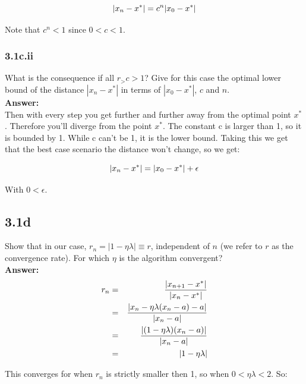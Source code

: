 \documentclass[a4paper]{article}
\begin{document}
\begin{equation}
\abs{x_n-x^*} = c^n \abs{x_0 - x^{*}}
\end{equation}

Note that $c^n < 1$ since $ 0 < c < 1$.


\subsubsection*{3.1c.ii}

What is the consequence if all $r_ > c > 1$? Give for this case the optimal lower bound of the distance $|x_n - x^*|$ in terms of $|x_0 - x^*|$, $c$ and $n$.\\

\textbf{Answer:}\\


Then with every step you get further and further away from the optimal point $x^*$. Therefore you'll diverge from the point $x^*$. The constant c is larger than 1, so it is bounded by 1. While c can't be 1, it is the lower bound. Taking this we get that the best case scenario the distance won't change, so we get:

\begin{equation}
\abs{x_n-x^*} = \abs{x_0-x^*} + \epsilon
\end{equation}

With $0 < \epsilon$.

\subsection*{3.1d}

Show that in our case, $r_n = |1 - \eta \lambda| \equiv r$, independent of $n$ (we refer to $r$ as the convergence rate). For which $\eta$ is the algorithm convergent?\\

\textbf{Answer:}\\

\begin{eqnarray}
r_n &=& \frac{\abs{x_{n+1} - x^*}}{\abs{x_n - x^*}}\\
&=& \frac{\abs{ x_n - \eta \lambda (x_n - a) - a}}{\abs{x_n - a}}\\
&=& \frac{\abs{(1-\eta \lambda) (x_n - a)}}{\abs{x_n - a}}\\
&=& \abs{1-\eta \lambda}
\end{eqnarray}


This converges for when $r_n$ is strictly smaller then 1, so when $0 < \eta \lambda < 2$. So:
\end{document}

